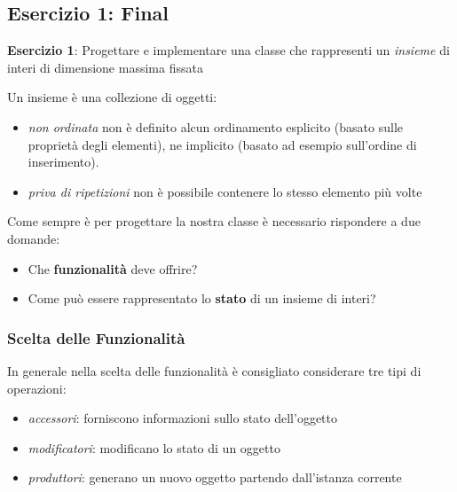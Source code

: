 \documentclass{article}
\begin{document}
\subsection{Esercizio 1: Final}

\begin{framed}
\textbf{Esercizio 1}: Progettare e implementare una classe che rappresenti un \emph{insieme} di interi di dimensione massima fissata
\end{framed}

Un insieme \`e una collezione di oggetti:
\begin{itemize}
	\item \emph{non ordinata} non è definito alcun ordinamento esplicito (basato sulle proprietà degli elementi),
	ne implicito (basato ad esempio sull'ordine di inserimento).
	\item \emph{priva di ripetizioni} non è possibile contenere lo stesso elemento più volte
\end{itemize}

Come sempre \`e per progettare la nostra classe \`e necessario rispondere a due domande:
\begin{itemize}
		\item Che \textbf{funzionalità} deve offrire?
	\item Come può essere rappresentato lo \textbf{stato} di un insieme di interi?
\end{itemize}

\subsubsection{Scelta delle Funzionalit\`a}
In generale nella scelta delle funzionalit\`a \`e consigliato considerare tre tipi di operazioni:

\begin{itemize}
\item \emph{accessori}: forniscono informazioni sullo stato dell'oggetto
\item \emph{modificatori}: modificano lo stato di un oggetto
\item \emph{produttori}: generano un nuovo oggetto partendo dall'istanza corrente
\end{itemize}
\end{document}

